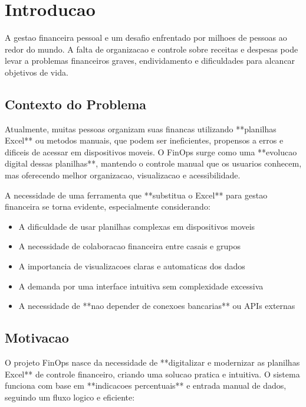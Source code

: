 \section{Introducao}

A gestao financeira pessoal e um desafio enfrentado por milhoes de pessoas ao redor do mundo. A falta de organizacao e controle sobre receitas e despesas pode levar a problemas financeiros graves, endividamento e dificuldades para alcancar objetivos de vida.

\subsection{Contexto do Problema}

Atualmente, muitas pessoas organizam suas financas utilizando **planilhas Excel** ou metodos manuais, que podem ser ineficientes, propensos a erros e dificeis de acessar em dispositivos moveis. O FinOps surge como uma **evolucao digital dessas planilhas**, mantendo o controle manual que os usuarios conhecem, mas oferecendo melhor organizacao, visualizacao e acessibilidade.

A necessidade de uma ferramenta que **substitua o Excel** para gestao financeira se torna evidente, especialmente considerando:

\begin{itemize}
    \item A dificuldade de usar planilhas complexas em dispositivos moveis
    \item A necessidade de colaboracao financeira entre casais e grupos
    \item A importancia de visualizacoes claras e automaticas dos dados
    \item A demanda por uma interface intuitiva sem complexidade excessiva
    \item A necessidade de **nao depender de conexoes bancarias** ou APIs externas
\end{itemize}

\subsection{Motivacao}

O projeto FinOps nasce da necessidade de **digitalizar e modernizar as planilhas Excel** de controle financeiro, criando uma solucao pratica e intuitiva. O sistema funciona com base em **indicacoes percentuais** e entrada manual de dados, seguindo um fluxo logico e eficiente:

